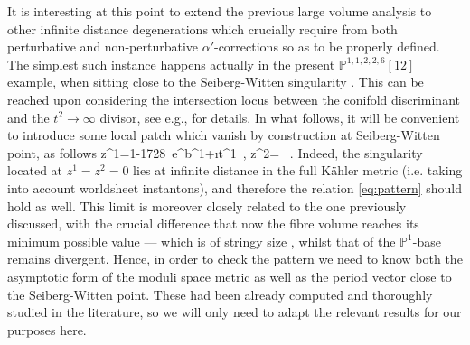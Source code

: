 It is interesting at this point to extend the previous large volume analysis to other infinite distance degenerations which crucially require from both perturbative and non-perturbative $\alpha'$-corrections so as to be properly defined. The simplest such instance happens actually in the present $\mathbb{P}^{1,1,2,2,6} [12]$ example, when sitting close to the Seiberg-Witten singularity \cite{Seiberg:1994rs}. This can be reached upon considering the intersection locus between the conifold discriminant and the $t^2 \to \infty$ divisor, see e.g., \cite{Kachru:1995fv, Curio:2000sc} for details. In what follows, it will be convenient to introduce some local patch which vanish by construction at Seiberg-Witten point, as follows
%
\beq \label{eq:normalcoords}
	z^1=1-1728\, e^{b^1+\i t^1}\, , \qquad z^2= \, .
\eeq
%
Indeed, the singularity located at $z^1=z^2=0$ lies at infinite distance in the full K\"ahler metric (i.e. taking into account worldsheet instantons), and therefore the relation \eqref{eq:pattern} should hold as well. This limit is moreover closely related to the one previously discussed, with the crucial difference that now the fibre volume reaches its minimum possible value --- which is of stringy size \cite{Aspinwall:1993xz, Greene:1996tx,Greene:2000ci}, whilst that of the $\mathbb{P}^1$-base remains divergent. Hence, in order to check the pattern we need to know both the asymptotic form of the moduli space metric as well as the period vector close to the Seiberg-Witten point. These had been already computed and thoroughly studied in the literature, so we will only need to adapt the relevant results for our purposes here. %

